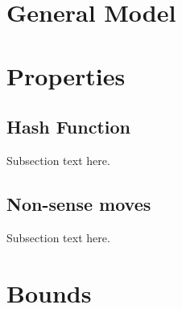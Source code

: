 %




\section{General Model}


\section{Properties}

\subsection{Hash Function}
Subsection text here.

\subsection{Non-sense moves}
Subsection text here.


\section{Bounds}

